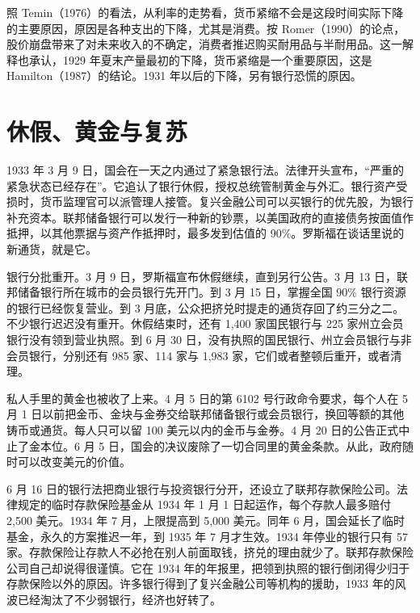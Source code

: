 照 Temin（1976）的看法，从利率的走势看，货币紧缩不会是这段时间实际下降的主要原因，原因是各种支出的下降，尤其是消费\cite{romer1990}。按 Romer（1990）的论点，股价崩盘带来了对未来收入的不确定，消费者推迟购买耐用品与半耐用品\cite{romer1990}。这一解释也承认，1929 年夏末产量最初的下降，货币紧缩是一个重要原因，这是 Hamilton（1987）的结论。1931 年以后的下降，另有银行恐慌的原因\cite{romer1990}。

\section{休假、黄金与复苏}\label{sec:depressionus-recovery}

1933 年 3 月 9 日，国会在一天之内通过了紧急银行法\cite{frheba}。法律开头宣布，“严重的紧急状态已经存在”\cite{eba1933}。它追认了银行休假，授权总统管制黄金与外汇\cite{eba1933}。银行资产受损时，货币监理官可以派管理人接管\cite{frheba}。复兴金融公司可以买银行的优先股，为银行补充资本\cite{frheba}。联邦储备银行可以发行一种新的钞票，以美国政府的直接债务按面值作抵押，以其他票据与资产作抵押时，最多发到估值的 90\%\cite{eba1933}。罗斯福在谈话里说的新通货，就是它\cite{fdr1933}。

银行分批重开。3 月 9 日，罗斯福宣布休假继续，直到另行公告\cite{app1933}。3 月 13 日，联邦储备银行所在城市的会员银行先开门。到 3 月 15 日，掌握全国 90\% 银行资源的银行已经恢复营业\cite{frhholiday}。到 3 月底，公众把挤兑时提走的通货存回了约三分之二\cite{frheba}。不少银行迟迟没有重开。休假结束时，还有 1,400 家国民银行与 225 家州立会员银行没有领到营业执照\cite{frb1937b}。到 6 月 30 日，没有执照的国民银行、州立会员银行与非会员银行，分别还有 985 家、114 家与 1,983 家，它们或者整顿后重开，或者清理\cite{frb1937b}。

私人手里的黄金也被收了上来。4 月 5 日的第 6102 号行政命令要求，每个人在 5 月 1 日以前把金币、金块与金券交给联邦储备银行或会员银行，换回等额的其他铸币或通货。每人只可以留 100 美元以内的金币与金券\cite{app1933}。4 月 20 日的公告正式中止了金本位\cite{frhgold}。6 月 5 日，国会的决议废除了一切合同里的黄金条款\cite{frhgold}。从此，政府随时可以改变美元的价值\cite{frhgold}。

6 月 16 日的银行法把商业银行与投资银行分开，还设立了联邦存款保险公司\cite{frhba33}。法律规定的临时存款保险基金从 1934 年 1 月 1 日起运作，每个存款人最多赔付 2,500 美元\cite{ba1933}。1934 年 7 月，上限提高到 5,000 美元\cite{frhba33,fdic1998}。同年 6 月，国会延长了临时基金，永久的方案推迟一年，到 1935 年 7 月才生效\cite{fdic1998}。1934 年停业的银行只有 57 家\cite{frb1937b}。存款保险让存款人不必抢在别人前面取钱，挤兑的理由就少了。联邦存款保险公司自己却说得很谨慎。它在 1934 年的年报里，把领到执照的银行倒闭得少归于存款保险以外的原因。许多银行得到了复兴金融公司等机构的援助，1933 年的风波已经淘汰了不少弱银行，经济也好转了\cite{fdic1998}。

